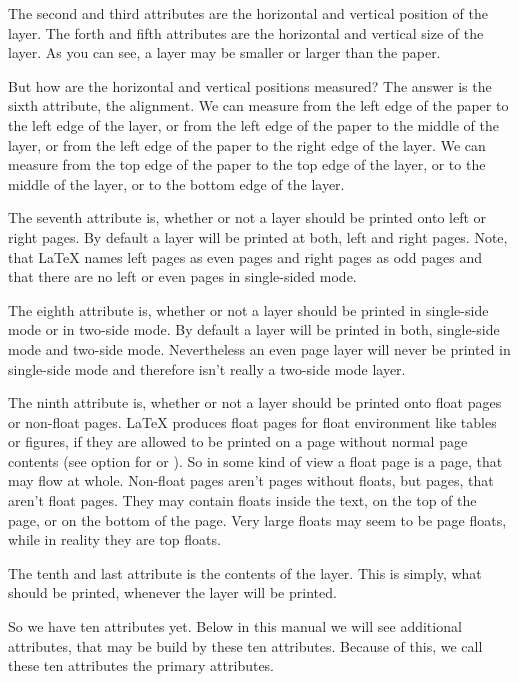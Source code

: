 The second and third attributes are the horizontal and vertical position of
the layer. The forth and fifth attributes are the horizontal and vertical size
of the layer. As you can see, a layer may be smaller or larger than the
paper.

But how are the horizontal and vertical positions measured? The answer
is the sixth attribute, the alignment. We can measure from the left edge of
the paper to the left edge of the layer, or from the left edge of the paper to
the middle of the layer, or from the left edge of the paper to the right edge
of the layer. We can measure from the top edge of the paper to the top edge of
the layer, or to the middle of the layer, or to the bottom edge of the layer.

The seventh attribute is, whether or not a layer should be
printed onto left or right pages. By default a layer will be printed at both,
left and right pages. Note, that \LaTeX{} names left pages as even pages and
right pages as odd pages and that there are no left or even pages in
single-sided mode.

The eighth attribute is, whether or not a layer should be printed in
single-side mode or in two-side mode. By default a layer will be printed in
both, single-side mode and two-side mode. Nevertheless an even page layer will
never be printed in single-side mode and therefore isn't really a two-side
mode layer.

The ninth attribute is, whether or not a layer should be
printed onto float pages or non-float pages. \LaTeX{} produces float pages for
float environment like tables or figures, if they are allowed to be printed on
a page without normal page contents (see option  for
 or ). So in some kind of view a float
page is a page, that may flow at whole. Non-float pages aren't pages
without floats, but pages, that aren't float pages. They may contain floats
inside the text, on the top of the page, or on the bottom of the page. Very
large floats may seem to be page floats, while in reality they are top floats.

The tenth and last attribute is the contents of the layer. This is simply,
what should be printed, whenever the layer will be printed.

So we have ten attributes yet. Below in this manual we will see additional
attributes, that may be build by these ten attributes. Because of this, we
call these ten attributes the primary attributes.

